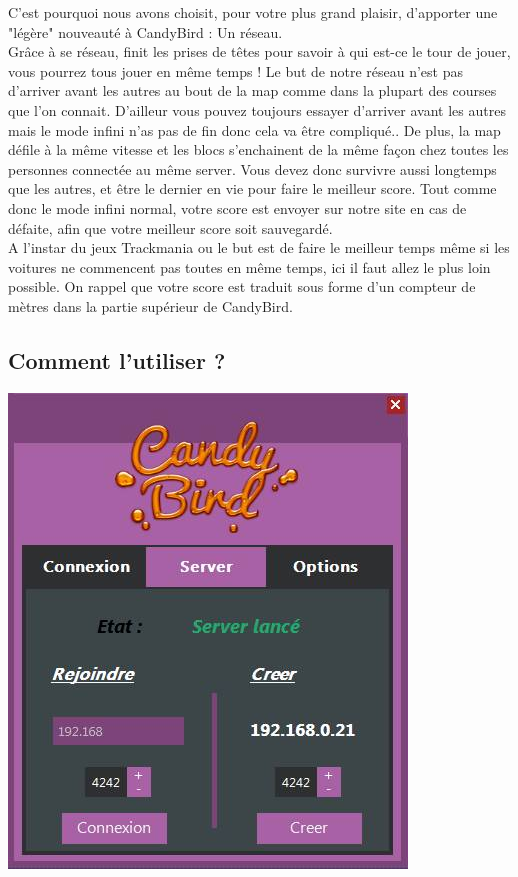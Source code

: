 \documentclass [11pt]{report}
\begin{document}
		C'est pourquoi nous avons choisit, pour votre plus grand plaisir, d'apporter une "légère" nouveauté à CandyBird : Un réseau.\\
		
		Grâce à se réseau, finit les prises de têtes pour savoir à qui est-ce le tour de jouer, vous pourrez tous jouer en même temps !
		Le but de notre réseau n'est pas d'arriver avant les autres au bout de la map comme dans la plupart des courses que l'on connait. D'ailleur vous pouvez toujours essayer d'arriver avant les autres mais le mode infini n'as pas de fin donc cela va être compliqué.. De plus, la map défile à la même vitesse et les blocs s'enchainent de la même façon chez toutes les personnes connectée au même server. Vous devez donc survivre aussi longtemps que les autres, et être le dernier en vie pour faire le meilleur score. Tout comme donc le mode infini normal, votre score est envoyer sur notre site en cas de défaite, afin que votre meilleur score soit sauvegardé.\\
		
		A l'instar du jeux Trackmania ou le but est de faire le meilleur temps même si les voitures ne commencent pas toutes en même temps, ici il faut allez le plus loin possible. On rappel que votre score est traduit sous forme d'un compteur de mètres dans la partie supérieur de CandyBird.
		
		\newpage
		
		\subsection{Comment l'utiliser ?}
		\vspace{6mm}
		\begin{center}\includegraphics[scale=0.43]{images/panel.jpg}\end{center}
		\vspace{6mm}
				
\end{document}

